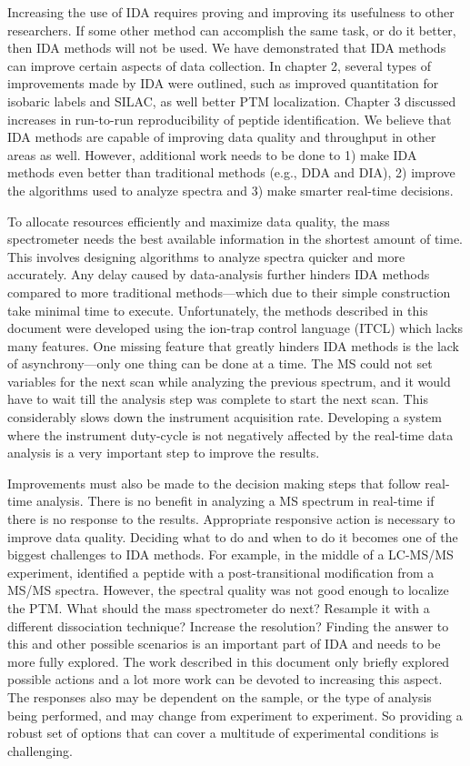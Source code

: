 Increasing the use of IDA requires proving and improving its usefulness to other researchers. If some other method can accomplish the same task, or do it better, then IDA methods will not be used. We have demonstrated that IDA methods can improve certain aspects of data collection. In chapter 2, several types of improvements made by IDA were outlined, such as improved quantitation for isobaric labels and SILAC, as well better PTM localization. Chapter 3 discussed increases in run-to-run reproducibility of peptide identification. We believe that IDA methods are capable of improving data quality and throughput in other areas as well. However, additional work needs to be done to 1) make IDA methods even better than traditional methods (e.g., DDA and DIA), 2) improve the algorithms used to analyze spectra and 3) make smarter real-time decisions.

To allocate resources efficiently and maximize data quality, the mass spectrometer needs the best available information in the shortest amount of time. This involves designing algorithms to analyze spectra quicker and more accurately. Any delay caused by data-analysis further hinders IDA methods compared to more traditional methods---which due to their simple construction take minimal time to execute. Unfortunately, the methods described in this document were developed using the ion-trap control language (ITCL) which lacks many features. One missing feature that greatly hinders IDA methods is the lack of asynchrony---only one thing can be done at a time. The MS could not set variables for the next scan while analyzing the previous spectrum, and it would have to wait till the analysis step was complete to start the next scan. This considerably slows down the instrument acquisition rate. Developing a system where the instrument duty-cycle is not negatively affected by the real-time data analysis is a very important step to improve the results. 

Improvements must also be made to the decision making steps that follow real-time analysis. There is no benefit in analyzing a MS spectrum in real-time if there is no response to the results. Appropriate responsive action is necessary to improve data quality. Deciding what to do and when to do it becomes one of the biggest challenges to IDA methods. For example, in the middle of a LC-MS/MS experiment, \inseq{} identified a peptide with a post-transitional modification from a MS/MS spectra. However, the spectral quality was not good enough to localize the PTM. What should the mass spectrometer do next? Resample it with a different dissociation technique? Increase the resolution? Finding the answer to this and other possible scenarios is an important part of IDA and needs to be more fully explored. The work described in this document only briefly explored possible actions and a lot more work can be devoted to increasing this aspect. The responses also may be dependent on the sample, or the type of analysis being performed, and may change from experiment to experiment. So providing a robust set of options that can cover a multitude of experimental conditions is challenging.

